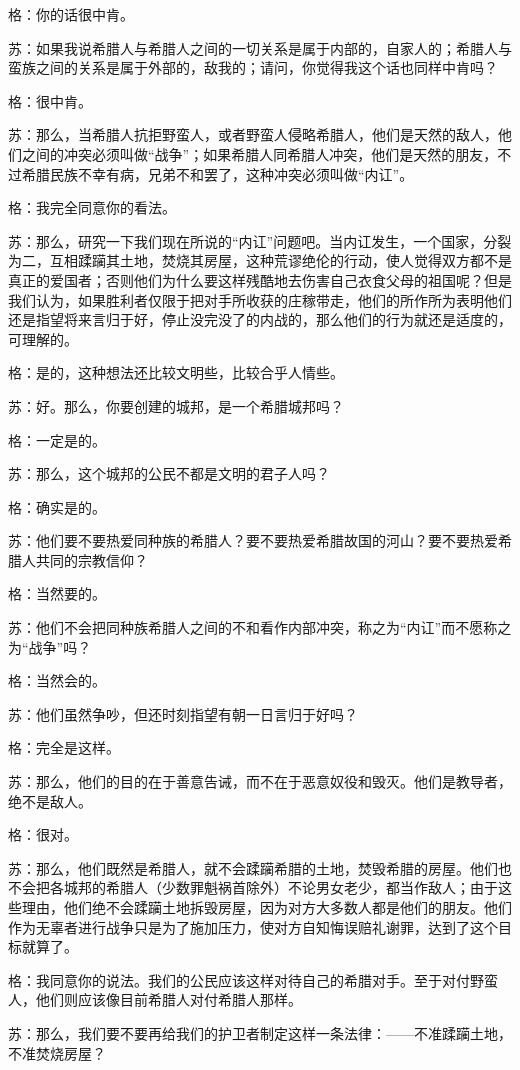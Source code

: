 \documentclass[12pt,oneside]{book}
\begin{document}
格：你的话很中肯。

苏：如果我说希腊人与希腊人之间的一切关系是属于内部的，自家人的；希腊人与蛮族之间的关系是属于外部的，敌我的；请问，你觉得我这个话也同样中肯吗？

格：很中肯。

苏：那么，当希腊人抗拒野蛮人，或者野蛮人侵略希腊人，他们是天然的敌人，他们之间的冲突必须叫做“战争”；如果希腊人同希腊人冲突，他们是天然的朋友，不过希腊民族不幸有病，兄弟不和罢了，这种冲突必须叫做“内讧”。

格：我完全同意你的看法。

苏：那么，研究一下我们现在所说的“内讧”问题吧。当内讧发生，一个国家，分裂为二，互相蹂躏其土地，焚烧其房屋，这种荒谬绝伦的行动，使人觉得双方都不是真正的爱国者；否则他们为什么要这样残酷地去伤害自己衣食父母的祖国呢？但是我们认为，如果胜利者仅限于把对手所收获的庄稼带走，他们的所作所为表明他们还是指望将来言归于好，停止没完没了的内战的，那么他们的行为就还是适度的，可理解的。

格：是的，这种想法还比较文明些，比较合乎人情些。

苏：好。那么，你要创建的城邦，是一个希腊城邦吗？

格：一定是的。

苏：那么，这个城邦的公民不都是文明的君子人吗？

格：确实是的。

苏：他们要不要热爱同种族的希腊人？要不要热爱希腊故国的河山？要不要热爱希腊人共同的宗教信仰？

格：当然要的。

苏：他们不会把同种族希腊人之间的不和看作内部冲突，称之为“内讧”而不愿称之为“战争”吗？

格：当然会的。

苏：他们虽然争吵，但还时刻指望有朝一日言归于好吗？

格：完全是这样。

苏：那么，他们的目的在于善意告诫，而不在于恶意奴役和毁灭。他们是教导者，绝不是敌人。

格：很对。

苏：那么，他们既然是希腊人，就不会蹂躏希腊的土地，焚毁希腊的房屋。他们也不会把各城邦的希腊人（少数罪魁祸首除外）不论男女老少，都当作敌人；由于这些理由，他们绝不会蹂躏土地拆毁房屋，因为对方大多数人都是他们的朋友。他们作为无辜者进行战争只是为了施加压力，使对方自知悔误赔礼谢罪，达到了这个目标就算了。

格：我同意你的说法。我们的公民应该这样对待自己的希腊对手。至于对付野蛮人，他们则应该像目前希腊人对付希腊人那样。

苏：那么，我们要不要再给我们的护卫者制定这样一条法律：——不准蹂躏土地，不准焚烧房屋？
\end{document}
